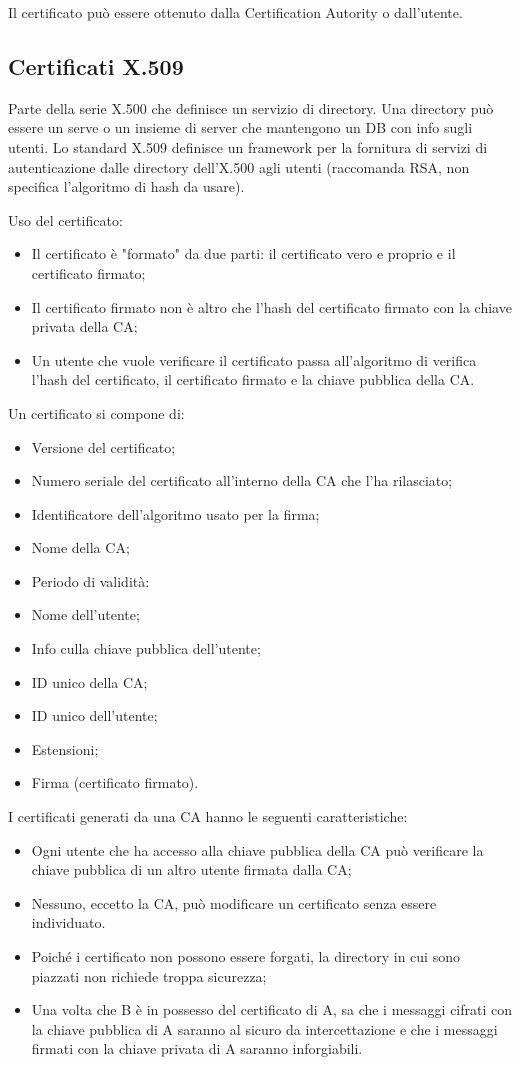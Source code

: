 Il certificato può essere ottenuto dalla Certification Autority o dall'utente.

\subsection{Certificati X.509}

Parte della serie X.500 che definisce un servizio di directory. Una directory può essere un serve o un insieme di server che mantengono un DB con info sugli utenti. 
Lo standard X.509 definisce un framework per la fornitura di servizi di autenticazione dalle directory dell'X.500 agli utenti (raccomanda RSA, non specifica l'algoritmo di hash da usare).

Uso del certificato:
\begin{itemize}
    \item Il certificato è "formato" da due parti: il certificato vero e proprio e il certificato firmato;
	\item Il certificato firmato non è altro che l'hash del certificato firmato con la chiave privata della CA;
	\item Un utente che vuole verificare il certificato passa all'algoritmo di verifica l'hash del certificato, il certificato firmato e la chiave pubblica della CA.
\end{itemize}

Un certificato si compone di:
\begin{itemize}
    \item Versione del certificato;
	\item Numero seriale del certificato all'interno della CA che l'ha rilasciato;
	\item Identificatore dell'algoritmo usato per la firma;
	\item Nome della CA;
	\item Periodo di validità:
	\item Nome dell'utente;
	\item Info culla chiave pubblica dell'utente;
	\item ID unico della CA;
	\item ID unico dell'utente;
	\item Estensioni;
	\item Firma (certificato firmato).
\end{itemize}

I certificati generati da una CA hanno le seguenti caratteristiche:
\begin{itemize}
    \item Ogni utente che ha accesso alla chiave pubblica della CA può verificare la chiave pubblica di un altro utente firmata dalla CA;
	\item Nessuno, eccetto la CA, può modificare un certificato senza essere individuato.
	\item Poiché i certificato non possono essere forgati, la directory in cui sono piazzati non richiede troppa sicurezza;
	\item Una volta che B è in possesso del certificato di A, sa che i messaggi cifrati con la chiave pubblica di A saranno al sicuro da intercettazione e che i messaggi firmati con la chiave privata di A saranno inforgiabili.
\end{itemize}

